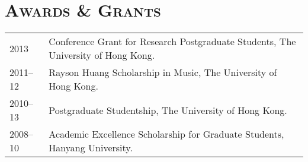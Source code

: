 \documentclass[a4paper,11pt]{article}
\begin{document}
%  
%  
%  
%  
%  
%  
%  
%  
%  
  
  \vspace{2.5mm}
  
  \section*{\textsc{Awards \& Grants}}
  
  \hspace*{-0.25cm}
  \begin{tabular}{p{2.5cm} l}
    2013 & Conference Grant for Research Postgraduate Students, The University of Hong Kong.\\
    2011–12 & Rayson Huang Scholarship in Music, The University of Hong Kong.\\
    2010–13 & Postgraduate Studentship, The University of Hong Kong.\\
    2008–10 & Academic Excellence Scholarship for Graduate Students, Hanyang University.
  \end{tabular}
  
  \vspace{2.5mm}
  
\end{document}
